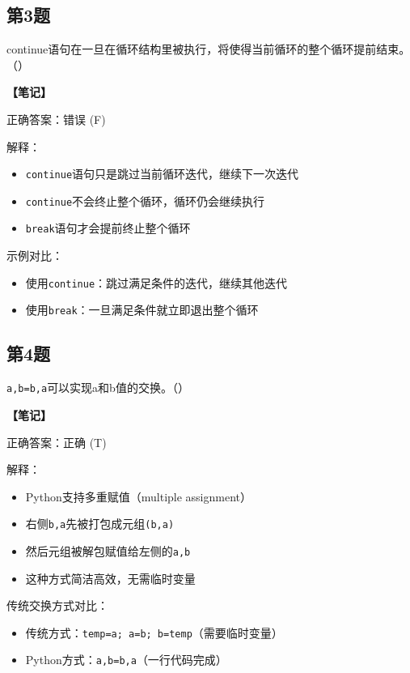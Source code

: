 \subsection{第3题}
continue语句在一旦在循环结构里被执行，将使得当前循环的整个循环提前结束。（\quad）

\begin{mdframed}[linewidth=1pt, linecolor=black]
  \textbf{\color{red}【笔记】}

  正确答案：错误 (F)

  解释：
  \begin{itemize}
    \item \texttt{continue}语句只是跳过当前循环迭代，继续下一次迭代
    \item \texttt{continue}不会终止整个循环，循环仍会继续执行
    \item \texttt{break}语句才会提前终止整个循环
  \end{itemize}

  示例对比：
  \begin{itemize}
    \item 使用\texttt{continue}：跳过满足条件的迭代，继续其他迭代
    \item 使用\texttt{break}：一旦满足条件就立即退出整个循环
  \end{itemize}

\end{mdframed}

\subsection{第4题}
\texttt{a,b=b,a}可以实现a和b值的交换。（\quad）

\begin{mdframed}[linewidth=1pt, linecolor=black]
  \textbf{\color{red}【笔记】}

  正确答案：正确 (T)

  解释：
  \begin{itemize}
    \item Python支持多重赋值（multiple assignment）
    \item 右侧\texttt{b,a}先被打包成元组\texttt{(b,a)}
    \item 然后元组被解包赋值给左侧的\texttt{a,b}
    \item 这种方式简洁高效，无需临时变量
  \end{itemize}

  传统交换方式对比：
  \begin{itemize}
    \item 传统方式：\texttt{temp=a; a=b; b=temp}（需要临时变量）
    \item Python方式：\texttt{a,b=b,a}（一行代码完成）
  \end{itemize}

\end{mdframed}


